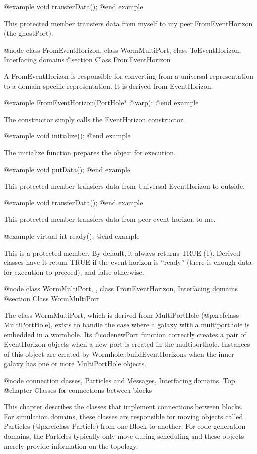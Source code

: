 @example
void transferData();
@end example

This protected member transfers data from myself to my peer
FromEventHorizon (the ghostPort).

@node class FromEventHorizon, class WormMultiPort, class ToEventHorizon, Interfacing domains
@section Class FromEventHorizon

A FromEventHorizon is responsible for converting from a universal
representation to a domain-specific representation.  It is derived from
EventHorizon.

@example
FromEventHorizon(PortHole* @var{p});
@end example

The constructor simply calls the EventHorizon constructor.

@example
void initialize();
@end example

The initialize function prepares the object for execution.

@example
void putData();
@end example

This protected member transfers data from Universal EventHorizon to outside.

@example
void transferData();
@end example

This protected member transfers data from peer event horizon to me.

@example
virtual int ready();
@end example

This is a protected member.  By default, it always returns TRUE (1).
Derived classes have it return TRUE if the event horizon is ``ready''
(there is enough data for execution to proceed), and false otherwise.

@node class WormMultiPort,  , class FromEventHorizon, Interfacing domains
@section Class WormMultiPort

The class WormMultiPort, which is derived from MultiPortHole
(@pxref{class MultiPortHole}), exists to
handle the case where a galaxy with a multiporthole is embedded in a
wormhole.  Its @code{newPort} function correctly creates a pair of
EventHorizon objects when a new port is created in the multiporthole.
Instances of this object are created by Wormhole::buildEventHorizons
when the inner galaxy has one or more MultiPortHole objects.

@node connection classes, Particles and Messages, Interfacing domains, Top
@chapter Classes for connections between blocks

This chapter describes the classes that implement connections between
blocks.  For simulation domains, these classes are responsible for
moving objects called Particles (@pxref{class Particle})
from one Block to another.  For code
generation domains, the Particles typically only move during scheduling
and these objects merely provide information on the topology.

